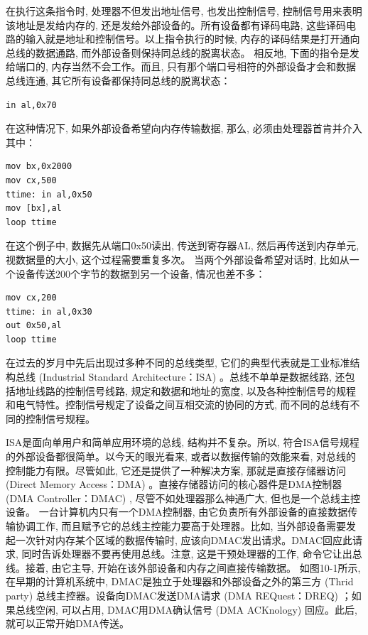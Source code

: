 \documentclass[12pt]{article}
\begin{document}
\begin{CJK}{UTF8}{gbsn}
在执行这条指令时, 处理器不但发出地址信号, 也发出控制信号, 控制信号用来表明该地址是发给内存的, 还是发给外部设备的。所有设备都有译码电路, 这些译码电路的输入就是地址和控制信号。以上指令执行的时候, 内存的译码结果是打开通向总线的数据通路, 而外部设备则保持同总线的脱离状态。
相反地, 下面的指令是发给端口的, 内存当然不会工作。而且, 只有那个端口号相符的外部设备才会和数据总线连通, 其它所有设备都保持同总线的脱离状态：

\begin{verbatim}
in al,0x70
\end{verbatim}

在这种情况下, 如果外部设备希望向内存传输数据, 那么, 必须由处理器首肯并介入其中：
\begin{verbatim}
mov bx,0x2000
mov cx,500
ttime: in al,0x50
mov [bx],al
loop ttime
\end{verbatim}
在这个例子中, 数据先从端口0x50读出, 传送到寄存器AL, 然后再传送到内存单元, 视数据量的大小, 这个过程需要重复多次。
当两个外部设备希望对话时, 比如从一个设备传送200个字节的数据到另一个设备, 情况也差不多：

\begin{verbatim}
mov cx,200
ttime: in al,0x30
out 0x50,al
loop ttime
\end{verbatim}

在过去的岁月中先后出现过多种不同的总线类型, 它们的典型代表就是工业标准结构总线 (Industrial Standard Architecture：ISA) 。总线不单单是数据线路, 还包括地址线路的控制信号线路, 规定和数据和地址的宽度, 以及各种控制信号的规程和电气特性。控制信号规定了设备之间互相交流的协同的方式, 而不同的总线有不同的控制信号规程。

ISA是面向单用户和简单应用环境的总线, 结构并不复杂。所以, 符合ISA信号规程的外部设备都很简单。以今天的眼光看来, 或者以数据传输的效能来看, 对总线的控制能力有限。尽管如此, 它还是提供了一种解决方案, 那就是直接存储器访问 (Direct Memory Access：DMA) 。直接存储器访问的核心器件是DMA控制器 (DMA Controller：DMAC) , 尽管不如处理器那么神通广大, 但也是一个总线主控设备。
一台计算机内只有一个DMA控制器, 由它负责所有外部设备的直接数据传输协调工作, 而且赋予它的总线主控能力要高于处理器。比如, 当外部设备需要发起一次针对内存某个区域的数据传输时, 应该向DMAC发出请求。DMAC回应此请求, 同时告诉处理器不要再使用总线。注意, 这是干预处理器的工作, 命令它让出总线。接着, 由它主导, 开始在该外部设备和内存之间直接传输数据。
如图10-1所示, 在早期的计算机系统中, DMAC是独立于处理器和外部设备之外的第三方 (Thrid party) 总线主控器。设备向DMAC发送DMA请求 (DMA REQuest：DREQ) ；如果总线空闲, 可以占用, DMAC用DMA确认信号 (DMA ACKnology) 回应。此后, 就可以正常开始DMA传送。
 

\end{CJK}
\end{document}
